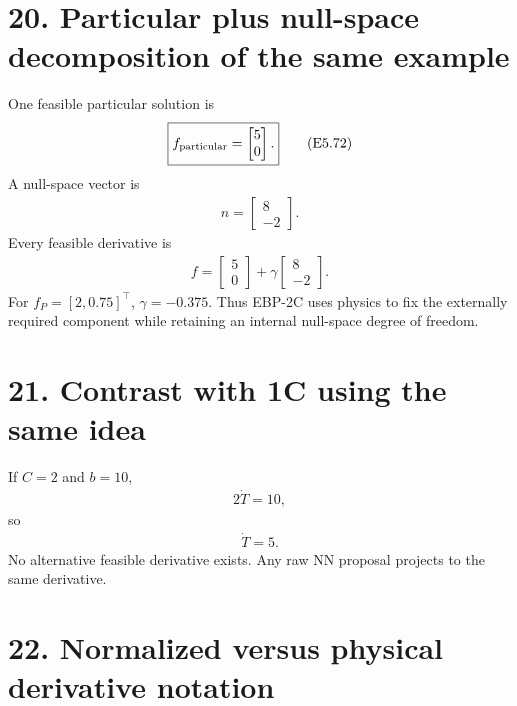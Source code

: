 \documentclass[11pt]{article}
\begin{document}
\section*{20. Particular plus null-space decomposition of the same example}

One feasible particular solution is
\begin{align}
\boxed{f_{\rm particular}=\begin{bmatrix}5\\0\end{bmatrix}.}
\tag{E5.72}
\end{align}
A null-space vector is
\begin{align}
\boxed{n=\begin{bmatrix}8\\-2\end{bmatrix}.}
\tag{E5.73}
\end{align}
Every feasible derivative is
\begin{align}
\boxed{f=\begin{bmatrix}5\\0\end{bmatrix}+\gamma\begin{bmatrix}8\\-2\end{bmatrix}.}
\tag{E5.74}
\end{align}
For \(f_P=[2,0.75]^\top\), \(\gamma=-0.375\). Thus EBP-2C uses physics to fix the externally required component while retaining an internal null-space degree of freedom.

\section*{21. Contrast with 1C using the same idea}

If \(C=2\) and \(b=10\),
\begin{align}
2\dot T=10,
\end{align}
so
\begin{align}
\boxed{\dot T=5.}
\tag{E5.75}
\end{align}
No alternative feasible derivative exists. Any raw NN proposal projects to the same derivative.

\section*{22. Normalized versus physical derivative notation}
\end{document}
